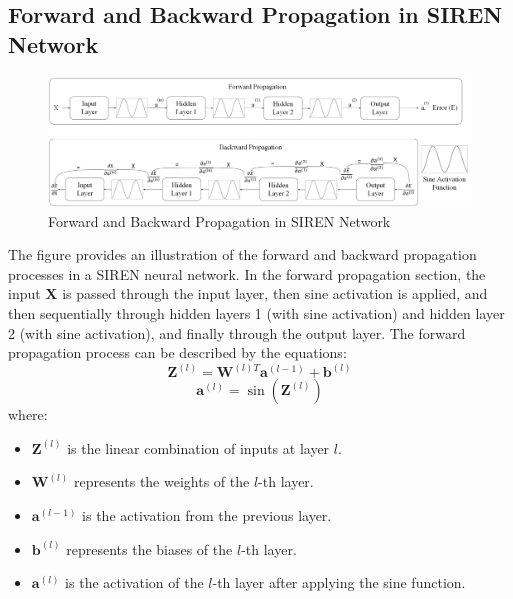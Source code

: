 \documentclass{ioereport}
\begin{document}
\subsection{Forward and Backward Propagation in SIREN Network}
\begin{figure}[H]
    \centering
    \includegraphics[width=\linewidth]{assets/Propagation concept figure Major Project.png}
    \caption{Forward and Backward Propagation in SIREN Network}
    \label{fig:propagation-diagram}
\end{figure}

The figure provides an illustration of the forward and backward propagation processes in a SIREN neural network. In the forward propagation section, the input \( \mathbf{X} \) is passed through the input layer, then sine activation is applied, and then sequentially through hidden layers 1 (with sine activation) and hidden layer 2 (with sine activation), and finally through the output layer. The forward propagation process can be described by the equations:
\begin{equation}
    \mathbf{Z}^{(l)} = \mathbf{W}^{(l)T} \mathbf{a}^{(l-1)} + \mathbf{b}^{(l)}
\end{equation}
\begin{equation}
    \mathbf{a}^{(l)} = \sin(\mathbf{Z}^{(l)})
\end{equation}
where:
\begin{itemize}
    \item \( \mathbf{Z}^{(l)} \) is the linear combination of inputs at layer \( l \).
    \item \( \mathbf{W}^{(l)} \) represents the weights of the \( l \)-th layer.
    \item \( \mathbf{a}^{(l-1)} \) is the activation from the previous layer.
    \item \( \mathbf{b}^{(l)} \) represents the biases of the \( l \)-th layer.
    \item \( \mathbf{a}^{(l)} \) is the activation of the \( l \)-th layer after applying the sine function.
\end{itemize}
\end{document}
